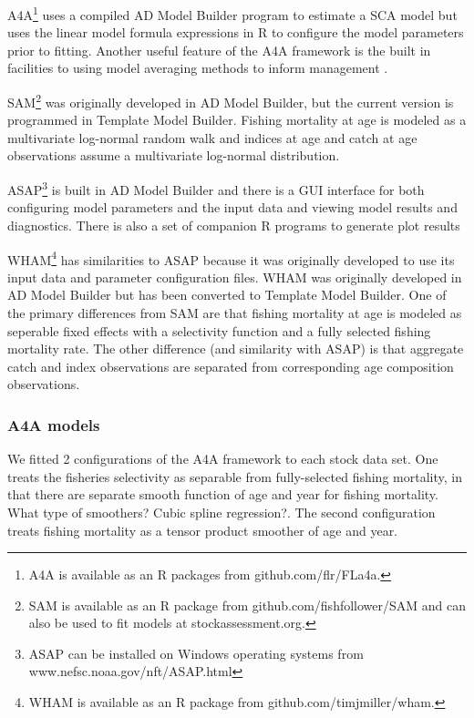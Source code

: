 \documentclass[12pt,letterpaper, leqno]{article}
\begin{document}
A4A\footnote{A4A is available as an R packages from github.com/flr/FLa4a.} uses a compiled AD Model Builder program to estimate a SCA model but uses the linear model formula expressions in R to configure the model parameters prior to fitting. Another useful feature of the A4A framework is the built in facilities to using model averaging methods to inform management \citep{millaretal15}. 

SAM\footnote{SAM is available as an R package from github.com/fishfollower/SAM and can also be used to fit models at stockassessment.org.} was originally developed in AD Model Builder, but the current version is programmed in Template Model Builder. Fishing mortality at age is modeled as a multivariate log-normal random walk and indices at age and catch at age observations assume a multivariate log-normal distribution.

ASAP\footnote{ASAP can be installed on Windows operating systems from www.nefsc.noaa.gov/nft/ASAP.html} is built in AD Model Builder and there is a GUI interface for both configuring model parameters and the input data and viewing model results and diagnostics. There is also a set of companion R programs to generate plot results

WHAM\footnote{WHAM is available as an R package from github.com/timjmiller/wham.} has similarities to ASAP because it was originally developed to use its input data and parameter configuration files. WHAM was originally developed in AD Model Builder but has been converted to Template Model Builder. One of the primary differences from SAM are that  fishing mortality at age is modeled as seperable fixed effects with a selectivity function and a fully selected fishing mortality rate. The other difference (and similarity with ASAP) is that aggregate catch and index observations are separated from corresponding age composition observations. 


\subsubsection*{A4A models}

We fitted 2 configurations of the A4A framework to each stock data set. One treats the fisheries selectivity as separable from fully-selected fishing mortality, in that there are separate smooth function of age and year for fishing mortality. What type of smoothers? Cubic spline regression?. The second configuration treats fishing mortality as a tensor product smoother of age and year. 
\end{document}
